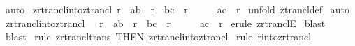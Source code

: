 \begin{isabellebody}
\isamarkupfalse%
\ auto\isanewline
{}\isamarkupfalse%
%
\endisatagproof
{\isafoldproof}%
%
\isadelimproof
\isanewline
%
\endisadelimproof
\isanewline
\isanewline
{}\isamarkupfalse%
\ zrtrancl{\isacharunderscore}into{\isacharunderscore}ztrancl{}{\isacharcolon}\ {\isachardoublequoteopen}{\isacharbang}{\isacharbang}r{\isachardot}\ {\isacharbrackleft}{\isacharbar}\ {\isacharparenleft}a{\isacharcomma}b{\isacharparenright}\ {\isacharcolon}\ r{\isacharpercent}{\isacharasterisk}{\isacharsemicolon}\ \ {\isacharparenleft}b{\isacharcomma}c{\isacharparenright}\ {\isacharcolon}\ r\ {\isacharbar}{\isacharbrackright}\ \ \ {\isacharequal}{\isacharequal}{\isachargreater}\ \ {\isacharparenleft}a{\isacharcomma}c{\isacharparenright}\ {\isacharcolon}\ r{\isacharpercent}{\isacharplus}{\isachardoublequoteclose}\isanewline
%
\isadelimproof
%
\endisadelimproof
%
\isatagproof
{}\isamarkupfalse%
\ {\isacharparenleft}unfold\ ztrancl{\isacharunderscore}def{\isacharparenright}\isanewline
{}\isamarkupfalse%
\ auto\isanewline
{}\isamarkupfalse%
%
\endisatagproof
{\isafoldproof}%
%
\isadelimproof
\isanewline
%
\endisadelimproof
\isanewline
\isanewline
{}\isamarkupfalse%
\ zrtrancl{\isacharunderscore}into{\isacharunderscore}ztrancl{}\ {\isacharcolon}\ \ {\isachardoublequoteopen}{\isacharbang}{\isacharbang}r{\isachardot}\ {\isacharbrackleft}{\isacharbar}\ {\isacharparenleft}a{\isacharcomma}b{\isacharparenright}\ {\isacharcolon}\ r{\isacharsemicolon}\ \ {\isacharparenleft}b{\isacharcomma}c{\isacharparenright}\ {\isacharcolon}\ r{\isacharpercent}{\isacharasterisk}\ {\isacharbar}{\isacharbrackright}\ \ \ {\isacharequal}{\isacharequal}{\isachargreater}\ \ {\isacharparenleft}a{\isacharcomma}c{\isacharparenright}\ {\isacharcolon}\ r{\isacharpercent}{\isacharplus}{\isachardoublequoteclose}\isanewline
%
\isadelimproof
%
\endisadelimproof
%
\isatagproof
{}\isamarkupfalse%
\ {\isacharparenleft}erule\ zrtranclE{\isacharparenright}\isanewline
{}\isamarkupfalse%
\ blast\isanewline
{}\isamarkupfalse%
\ blast\isanewline
{}\isamarkupfalse%
\ {\isacharparenleft}rule\ zrtrancl{\isacharunderscore}trans\ {\isacharbrackleft}THEN\ zrtrancl{\isacharunderscore}into{\isacharunderscore}ztrancl{}{\isacharbrackright}{\isacharparenright}\isanewline
{}\isamarkupfalse%
\ {\isacharparenleft}rule\ r{\isacharunderscore}into{\isacharunderscore}zrtrancl{\isacharparenright}{\isacharplus}\isanewline
{}\isamarkupfalse%

\end{isabellebody}
